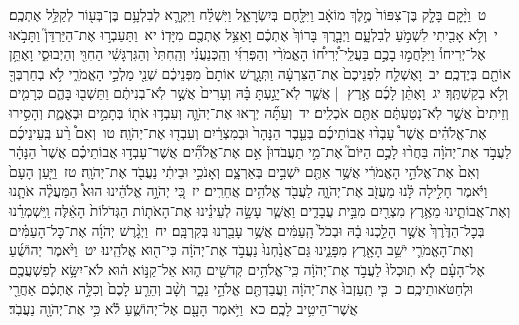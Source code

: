\documentclass[18pt]{article}
\newcommand{\kri}[1]{\Afootnote{#1}}	%
\begin{document}
 {\loc ט~}וַיָּ֨קׇם בָּלָ֤ק בֶּן־צִפּוֹר֙ מֶ֣לֶךְ מוֹאָ֔ב וַיִּלָּ֖חֶם בְּיִשְׂרָאֵ֑ל וַיִּשְׁלַ֗ח וַיִּקְרָ֛א לְבִלְעָ֥ם בֶּן־בְּע֖וֹר לְקַלֵּ֥ל אֶתְכֶֽם׃ \startlock
 {\loc י~}וְלֹ֥א אָבִ֖יתִי לִשְׁמֹ֣עַ לְבִלְעָ֑ם וַיְבָ֤רֶךְ בָּרוֹךְ֙ אֶתְכֶ֔ם וָאַצִּ֥ל אֶתְכֶ֖ם מִיָּדֽוֹ׃ \startlock
 {\loc יא~}וַתַּעַבְר֣וּ אֶת־הַיַּרְדֵּן֮ וַתָּבֹ֣אוּ אֶל־יְרִיחוֹ֒ וַיִּלָּחֲמ֣וּ בָכֶ֣ם בַּעֲלֵֽי־יְ֠רִיח֠וֹ הָאֱמֹרִ֨י וְהַפְּרִזִּ֜י וְהַֽכְּנַעֲנִ֗י וְהַֽחִתִּי֙ וְהַגִּרְגָּשִׁ֔י הַחִוִּ֖י וְהַיְבוּסִ֑י וָאֶתֵּ֥ן אוֹתָ֖ם בְּיֶדְכֶֽם׃ \startlock
 {\loc יב~}וָאֶשְׁלַ֤ח לִפְנֵיכֶם֙ אֶת־הַצִּרְעָ֔ה וַתְּגָ֤רֶשׁ אוֹתָם֙ מִפְּנֵיכֶ֔ם שְׁנֵ֖י מַלְכֵ֣י הָאֱמֹרִ֑י לֹ֥א בְחַרְבְּךָ֖ וְלֹ֥א בְקַשְׁתֶּֽךָ׃ \startlock
 {\loc יג~}וָאֶתֵּ֨ן לָכֶ֜ם אֶ֣רֶץ  |  אֲשֶׁ֧ר לֹֽא־יָגַ֣עְתָּ בָּ֗הּ וְעָרִים֙ אֲשֶׁ֣ר לֹֽא־בְנִיתֶ֔ם וַתֵּשְׁב֖וּ בָּהֶ֑ם כְּרָמִ֤ים וְזֵיתִים֙ אֲשֶׁ֣ר לֹֽא־נְטַעְתֶּ֔ם אַתֶּ֖ם אֹכְלִֽים׃ \startlock
 {\loc יד~}וְעַתָּ֞ה יְר֧אוּ אֶת־יְהֹוָ֛ה וְעִבְד֥וּ אֹת֖וֹ בְּתָמִ֣ים וּבֶאֱמֶ֑ת וְהָסִ֣ירוּ אֶת־אֱלֹהִ֗ים אֲשֶׁר֩ עָבְד֨וּ אֲבוֹתֵיכֶ֜ם בְּעֵ֤בֶר הַנָּהָר֙ וּבְמִצְרַ֔יִם וְעִבְד֖וּ אֶת־יְהֹוָֽה׃ \startlock
 {\loc טו~}וְאִם֩ רַ֨ע בְּֽעֵינֵיכֶ֜ם לַעֲבֹ֣ד אֶת־יְהֹוָ֗ה בַּחֲר֨וּ לָכֶ֣ם הַיּוֹם֮ אֶת־מִ֣י תַעֲבֹדוּן֒ אִ֣ם אֶת־אֱלֹהִ֞ים אֲשֶׁר־עָבְד֣וּ אֲבוֹתֵיכֶ֗ם אֲשֶׁר֙  \edtext{(בעבר)}{\kri{קרי: מֵעֵ֣בֶר}}  הַנָּהָ֔ר וְאִם֙ אֶת־אֱלֹהֵ֣י הָאֱמֹרִ֔י אֲשֶׁ֥ר אַתֶּ֖ם יֹשְׁבִ֣ים בְּאַרְצָ֑ם וְאָנֹכִ֣י וּבֵיתִ֔י נַעֲבֹ֖ד אֶת־יְהֹוָֽה׃ \startlock
 {\loc טז~}וַיַּ֤עַן הָעָם֙ וַיֹּ֔אמֶר חָלִ֣ילָה לָּ֔נוּ מֵעֲזֹ֖ב אֶת־יְהֹוָ֑ה לַעֲבֹ֖ד אֱלֹהִ֥ים אֲחֵרִֽים׃ \startlock
 {\loc יז~}כִּ֚י יְהֹוָ֣ה אֱלֹהֵ֔ינוּ הוּא֩ הַמַּעֲלֶ֨ה אֹתָ֧נוּ וְאֶת־אֲבוֹתֵ֛ינוּ מֵאֶ֥רֶץ מִצְרַ֖יִם מִבֵּ֣ית עֲבָדִ֑ים וַאֲשֶׁ֧ר עָשָׂ֣ה לְעֵינֵ֗ינוּ אֶת־הָאֹת֤וֹת הַגְּדֹלוֹת֙ הָאֵ֔לֶּה וַֽיִּשְׁמְרֵ֗נוּ בְּכׇל־הַדֶּ֙רֶךְ֙ אֲשֶׁ֣ר הָלַ֣כְנוּ בָ֔הּ וּבְכֹל֙ הָֽעַמִּ֔ים אֲשֶׁ֥ר עָבַ֖רְנוּ בְּקִרְבָּֽם׃ \startlock
 {\loc יח~}וַיְגָ֨רֶשׁ יְהֹוָ֜ה אֶת־כׇּל־הָעַמִּ֗ים וְאֶת־הָאֱמֹרִ֛י יֹשֵׁ֥ב הָאָ֖רֶץ מִפָּנֵ֑ינוּ גַּם־אֲנַ֙חְנוּ֙ נַעֲבֹ֣ד אֶת־יְהֹוָ֔ה כִּי־ה֖וּא אֱלֹהֵֽינוּ׃ \startlock
 {\loc יט~}וַיֹּ֨אמֶר יְהוֹשֻׁ֜עַ אֶל־הָעָ֗ם לֹ֤א תֽוּכְלוּ֙ לַעֲבֹ֣ד אֶת־יְהֹוָ֔ה כִּֽי־אֱלֹהִ֥ים קְדֹשִׁ֖ים ה֑וּא אֵל־קַנּ֣וֹא ה֔וּא לֹא־יִשָּׂ֥א לְפִשְׁעֲכֶ֖ם וּלְחַטֹּאותֵיכֶֽם׃ \startlock
 {\loc כ~}כִּ֤י תַֽעַזְבוּ֙ אֶת־יְהֹוָ֔ה וַעֲבַדְתֶּ֖ם אֱלֹהֵ֣י נֵכָ֑ר וְשָׁ֨ב וְהֵרַ֤ע לָכֶם֙ וְכִלָּ֣ה אֶתְכֶ֔ם אַחֲרֵ֖י אֲשֶׁר־הֵיטִ֥יב לָכֶֽם׃ \startlock
 {\loc כא~}וַיֹּ֥אמֶר הָעָ֖ם אֶל־יְהוֹשֻׁ֑עַ לֹ֕א כִּ֥י אֶת־יְהֹוָ֖ה נַעֲבֹֽד׃ \startlock
\end{document}
